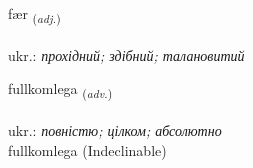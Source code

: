 \documentclass[frontgrid, backgrid]{flacards}\usepackage[]{graphicx}\usepackage[]{xcolor}
\begin{document}
\renewcommand{\flhead}{\vskip5pt \fboxsep=0pt {\small\bfseries\footnotesize Lýsingarorð | прикметник}}
\renewcommand{\fcfoot}{\vskip5pt \fboxsep=0pt \hspace{2pt}{\small\bfseries\footnotesize 3K}}

\renewcommand{\blhead}{\vskip5pt {\small\bfseries\footnotesize Lýsingarorð | прикметник }}
\renewcommand{\bcfoot}{\vskip5pt \hspace{2pt}{\small\bfseries\footnotesize 3K}}


{fær \small{\textsubscript{(\textit{adj.})}} \\[1ex] %
\textphonetic{[faiːr]} \\
ukr.: \emph{прохідний; здібний; талановитий} \\  [2ex]
\renewcommand*{\arraystretch}{0.8}
}


\renewcommand{\flhead}{\vskip5pt \fboxsep=0pt {\small\bfseries\footnotesize Atviksorð | прислівник}}
\renewcommand{\fcfoot}{\vskip5pt \fboxsep=0pt \hspace{2pt}{\small\bfseries\footnotesize 3K}}

\renewcommand{\blhead}{\vskip5pt {\small\bfseries\footnotesize Atviksorð | прислівник }}
\renewcommand{\bcfoot}{\vskip5pt \hspace{2pt}{\small\bfseries\footnotesize 3K}}


{fullkomlega \small{\textsubscript{(\textit{adv.})}} \\[1ex]
 \\
ukr.: \emph{повністю; цілком; абсолютно} \\  [2ex]
fullkomlega (Indeclinable)}
\end{document}
